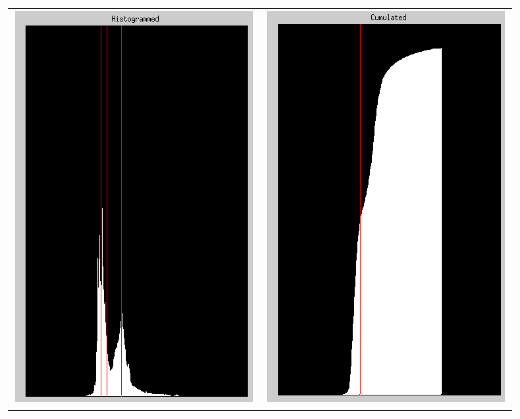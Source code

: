 \documentclass[12pt]{article}
\begin{document}
\newpage
\begin{table}[h!]
\begin{center}
\begin{tabular} {c c}
  \includegraphics[scale=.8]{Images/TotalModule/Histogrammed.png}
&
  \includegraphics[scale=.8]{Images/TotalModule/Cumulated.png}

\end{tabular}
\end{center}
\end{table}
\end{document}
